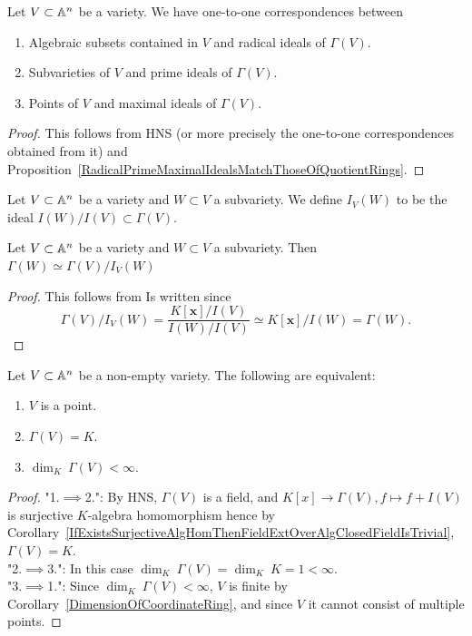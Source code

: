 \begin{proposition}\label{CorrespondenceOfDifferentTypesOfAlgebraicSetsWithDifferentTypesOfIdeals}
    Let $V\subset \mathbb{A}^n$ be a variety. We have one-to-one correspondences between  
    \begin{enumerate}
        \item Algebraic subsets contained in $V$ and radical ideals of $\Gamma(V)$.
        \item Subvarieties of $V$ and prime ideals of $\Gamma(V)$.
        \item Points of $V$ and maximal ideals of $\Gamma(V)$.
    \end{enumerate}
\end{proposition}
\begin{proof}
    This follows from HNS (or more precisely the one-to-one correspondences obtained from it) and Proposition~\ref{RadicalPrimeMaximalIdealsMatchThoseOfQuotientRings}.
\end{proof}
\begin{definition}\label{RestrictionOfPolynomialFunctions}
    Let $V\subset \mathbb{A}^n$ be a variety and $W\subset V$ a subvariety. We define $I_V(W)$ to be the ideal $I(W)/I(V)\subset \Gamma(V)$.
\end{definition}
\begin{lemma}
    Let $V\subset \mathbb{A}^n$ be a variety and $W\subset V$ a subvariety. Then $\Gamma(W)\simeq \Gamma(V)/I_V(W)$
\end{lemma}
\begin{proof}
    This follows from {\Large Is written} since 
    $$\Gamma(V)/I_V(W) = \frac{K[\mathbf{x}]/I(V)}{I(W)/I(V)}\simeq K[\mathbf{x}]/I(W) = \Gamma(W).$$
\end{proof}
\begin{proposition}
    Let $V\subset \mathbb{A}^n$ be a non-empty variety. The following are equivalent:
    \begin{enumerate}
        \item $V$ is a point.
        \item $\Gamma(V)= K$.
        \item $\dim_K \ \Gamma(V) < \infty$.
    \end{enumerate}
\end{proposition}
\begin{proof}
    "1.$\implies$2.": By HNS, $\Gamma(V)$ is a field, and $K[x]\rightarrow \Gamma(V), f\mapsto f+I(V)$ is surjective $K$-algebra homomorphism hence by Corollary~\ref{IfExistsSurjectiveAlgHomThenFieldExtOverAlgClosedFieldIsTrivial}, $\Gamma(V) = K$.\\
    "2.$\implies$3.": In this case $\dim_K\ \Gamma(V) = \dim_K\ K = 1<\infty$.\\
    "3.$\implies$1.": Since $\dim_K\ \Gamma(V)<\infty$, $V$ is finite by Corollary~\ref{DimensionOfCoordinateRing}, and since $V$ it cannot consist of multiple points.  
\end{proof}
